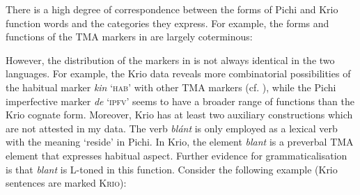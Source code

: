 There is a high degree of correspondence between the forms of Pichi and Krio function words and the categories they express. For example, the forms and functions of the TMA markers in  are largely coterminous: 

However, the distribution of the markers in  is not always identical in the two languages. For example, the Krio data reveals more combinatorial possibilities of the habitual marker \textit{kin} ‘\textsc{hab}’ with other TMA markers (cf. \citealt{Dandeson2001}), while the Pichi imperfective marker \textit{de} ‘\textsc{ipfv}’ seems to have a broader range of functions than the Krio cognate form. Moreover, Krio has at least two auxiliary constructions which are not attested in my data. The verb \textit{blánt} is only employed as a lexical verb with the meaning ‘reside’ in Pichi. In Krio, the element \textit{blant} is a preverbal TMA element that expresses habitual aspect. Further evidence for grammaticalisation is that \textit{blant} is L-toned in this function. Consider the following example (Krio sentences are marked \textsc{Krio}):

